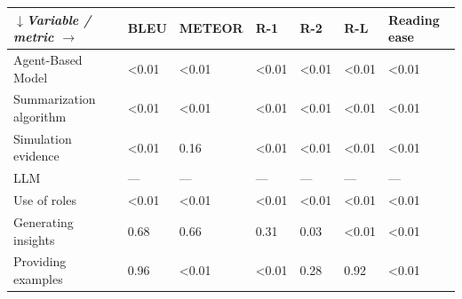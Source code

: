 \begin{tabular}{|l|l|l|l|l|l|l|}
\hline
\textit{$\downarrow$Variable / metric $\rightarrow$} & BLEU & METEOR & R-1 & R-2 & R-L & Reading ease \\
 \hline
 Agent-Based Model & \textless{}0.01 & \textless{}0.01 & \textless{}0.01 & \textless{}0.01 & \textless{}0.01 & \textless{}0.01 \\
 \hline
 Summarization algorithm & \textless{}0.01 & \textless{}0.01 & \textless{}0.01 & \textless{}0.01 & \textless{}0.01 & \textless{}0.01 \\
 \hline
 Simulation evidence & \textless{}0.01 & 0.16 & \textless{}0.01 & \textless{}0.01 & \textless{}0.01 & \textless{}0.01 \\
 \hline
 LLM & — & — & — & — & — & — \\
 \hline
 Use of roles & \textless{}0.01 & \textless{}0.01 & \textless{}0.01 & \textless{}0.01 & \textless{}0.01 & \textless{}0.01 \\
 \hline
 Generating insights & 0.68 & 0.66 & 0.31 & 0.03 & \textless{}0.01 & \textless{}0.01 \\
 \hline
 Providing examples & 0.96 & \textless{}0.01 & \textless{}0.01 & 0.28 & 0.92 & \textless{}0.01 \\
\hline
\end{tabular}
